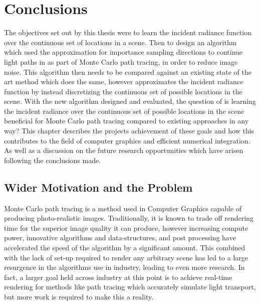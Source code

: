 \documentclass[../dissertation.tex]{subfiles}
\begin{document}
\chapter{Conclusions}
\label{chap:conclusion}

The objectives set out by this thesis were to learn the incident radiance function over the continuous set of locations in a scene. Then to design an algorithm which used the  approximation for importance sampling directions to continue light paths in as part of Monte Carlo path tracing, in order to reduce image noise. This algorithm then needs to be compared against an existing state of the art method which does the same, however approximates the incident radiance function by instead discretizing the continuous set of possible locations in the scene. With the new algorithm designed and evaluated, the question of is learning the incident radiance over the continuous set of possible locations in the scene beneficial for Monte Carlo path tracing compared to existing approaches in any way? This chapter describes the projects achievement of these goals and how this contributes to the field of computer graphics and efficient numerical integration. As well as  a discussion on the future research opportunities which have arisen following the conclusions made.

\section{Wider Motivation and the Problem}

Monte Carlo path tracing is a method used in Computer Graphics capable of producing photo-realistic images. Traditionally, it is known to trade off rendering time for the superior image quality it can produce, however increasing compute power, innovative algorithms and data-structures, and post processing have accelerated the speed of the algorithm by a significant amount. This combined with the lack of set-up required to render any arbitrary scene has led to a large resurgence in the algorithms use in industry, leading to even more research. In fact, a larger goal held across industry at this point is to achieve real-time rendering for methods like path tracing which accurately simulate light transport, but more work is required to make this a reality.\\
\end{document}
